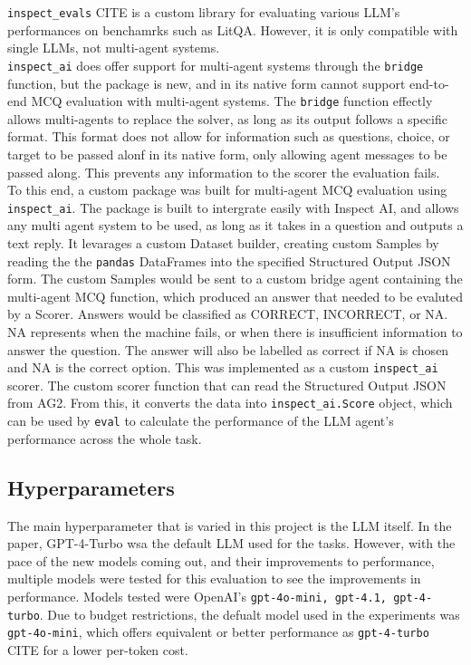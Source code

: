 \texttt{inspect\_evals} CITE is a custom library for evaluating various LLM's performances on benchamrks such as LitQA. However, it is only compatible with single LLMs, not multi-agent systems. \\

\texttt{inspect\_ai} does offer support for multi-agent systems through the \texttt{bridge} function, but the package is new, and in its native form cannot support end-to-end MCQ evaluation with multi-agent systems. The \texttt{bridge} function effectly allows multi-agents to replace the solver, as long as its output follows a specific format.
This format does not allow for information such as questions, choice, or target to be passed alonf in its native form, only allowing agent messages to be passed along. 
This prevents any information to the scorer the evaluation fails. \\

To this end, a custom package was built for multi-agent MCQ evaluation using \texttt{inspect\_ai}. The package is built to intergrate easily with Inspect AI, and allows any multi agent system to be used, as long as it takes in a question and outputs a text reply. 
It levarages a custom Dataset builder, creating custom Samples by reading the the \texttt{pandas} DataFrames into the specified Structured Output JSON form. The custom Samples would be sent to a custom bridge agent containing the multi-agent MCQ function, which produced an answer that needed to be evaluted by a Scorer. Answers would be classified as CORRECT, INCORRECT, or NA. NA represents when the machine fails, or when there is insufficient information to answer the question. The answer will also be labelled as correct if NA is chosen and NA is the correct option. This was implemented as a custom \texttt{inspect\_ai} scorer. The custom scorer function that can read the Structured Output JSON from AG2. From this, it converts the data into \texttt{inspect\_ai.Score} object, which can be used by \texttt{eval} to calculate the performance of the LLM agent's performance across the whole task. \\

\subsection{Hyperparameters}

The main hyperparameter that is varied in this project is the LLM itself. In the paper, GPT-4-Turbo wsa the default LLM used for the tasks. However, with the pace of the new models coming out, and their improvements to performance, multiple models were tested for this evaluation to see the improvements in performance. Models tested were OpenAI's \texttt{gpt-4o-mini, gpt-4.1, gpt-4-turbo}. Due to budget restrictions, the defualt model used in the experiments was \texttt{gpt-4o-mini}, which offers equivalent or better performance as \texttt{gpt-4-turbo} CITE for a lower per-token cost. \\

